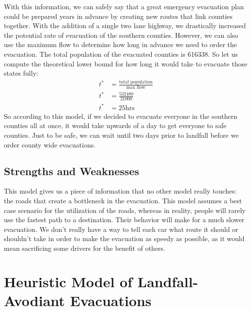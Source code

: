 \documentclass[titlepage]{article}
\begin{document}
    With this information, we can safely say that a great emergency evacuation plan could be prepared years in advance by creating new routes that link counties together. With the addition of a single two lane highway, we drastically increased the potential rate of evacuation of the southern counties. However, we can also use the maximum flow to determine how long in advance we need to order the evacuation.
    The total population of the evacuated counties is 616338. So let us compute the theoretical lower bound for how long it would take to evacuate those states fully:
    \begin{align*}
        t^* &= \frac{\text{total population}}{\text{max flow}}\\
        t^* &= \frac{532480}{21000}\\
        t^* &= 25 \text{hrs}
    \end{align*}
    So according to this model, if we decided to evacuate everyone in the southern counties all at once, it would take upwards of a day to get everyone to safe counties. Just to be safe, we can wait until two days prior to landfall before we order county wide evacuations.
  \subsection{Strengths and Weaknesses}
    This model gives us a piece of information that no other model really touches: the roads that create a bottleneck in the evacuation. %
    This model assumes a best case scenario for the utilization of the roads, whereas in reality, people will rarely use the fastest path to a destination. Their behavior will make for a much slower evacuation. We don't really have a way to tell each car what route it should or shouldn't take in order to make the evacuation as speedy as possible, as it would mean sacrificing some drivers for the benefit of others.

\section{Heuristic Model of Landfall-Avodiant Evacuations}
\label{sec:heuristic}
\end{document}
